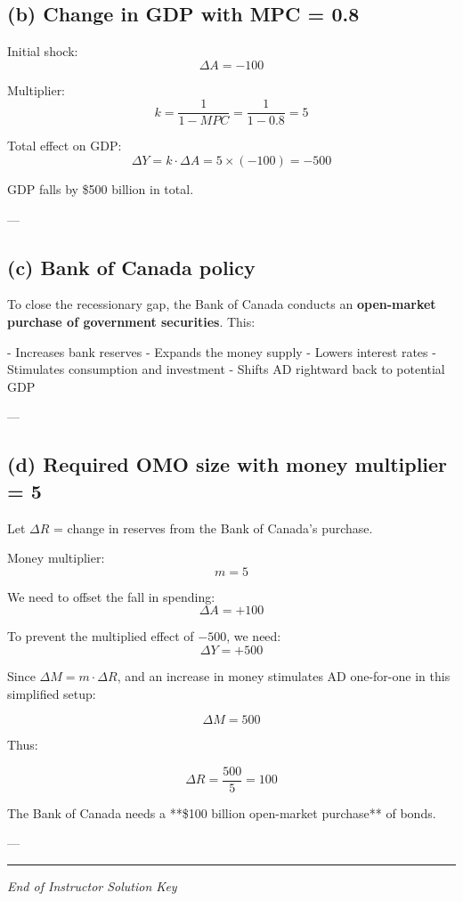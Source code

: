 \documentclass[12pt]{article}
\begin{document}
\subsection*{(b) Change in GDP with MPC = 0.8}

Initial shock:  
\[
\Delta A = -100
\]

Multiplier:  
\[
k = \frac{1}{1 - MPC} = \frac{1}{1 - 0.8} = 5
\]

Total effect on GDP:  
\[
\Delta Y = k \cdot \Delta A = 5 \times (-100) = \boxed{-500}
\]

GDP falls by \$500 billion in total.

---

\subsection*{(c) Bank of Canada policy}

To close the recessionary gap, the Bank of Canada conducts an  
\textbf{open-market purchase of government securities}.  
This:

- Increases bank reserves  
- Expands the money supply  
- Lowers interest rates  
- Stimulates consumption and investment  
- Shifts AD rightward back to potential GDP

---

\subsection*{(d) Required OMO size with money multiplier = 5}

Let \(\Delta R\) = change in reserves from the Bank of Canada's purchase.

Money multiplier:  
\[
m = 5
\]

We need to offset the fall in spending:  
\[
\Delta A = +100
\]

To prevent the multiplied effect of \(-500\), we need:  
\[
\Delta Y = +500
\]

Since \(\Delta M = m \cdot \Delta R\), and an increase in money stimulates AD one-for-one in this simplified setup:

\[
\Delta M = 500
\]

Thus:

\[
\Delta R = \frac{500}{5} = \boxed{100}
\]

The Bank of Canada needs a **\$100 billion open-market purchase** of bonds.

---

\begin{center}
\hrule
\vspace{0.8em}
\textit{End of Instructor Solution Key}
\end{center}
\end{document}
